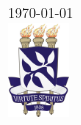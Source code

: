 \begin{titlepage}

  
{\large \today}\\[2cm] %

\includegraphics[height=2.5cm]{latex/brasao_ufba.jpg}\\ %
  

\vfill %

\end{titlepage}

\tableofcontents
\newpage